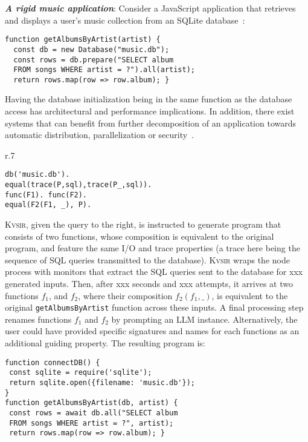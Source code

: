\documentclass[sigplan]{acmart}
\newcommand{\sys}{{\scshape Kv{\textalpha}sir}\xspace}
\newcommand{\heading}[1]{\vspace{2pt}\noindent\textbf{\emph{#1}}:\enspace}
\newcommand{\ttt}[1]{\texttt{#1}}
\newcommand{\xxx}{\colorbox{red!30}{xxx}\xspace}
\begin{document}
\heading{A rigid music application}
Consider a JavaScript application that retrieves and displays a user's music
collection from an SQLite database~\cite{codewithsadeemusicplayer, beets}:

\begin{verbatim}
function getAlbumsByArtist(artist) {
  const db = new Database("music.db");
  const rows = db.prepare("SELECT album
  FROM songs WHERE artist = ?").all(artist);
  return rows.map(row => row.album); }
\end{verbatim}

Having the database initialization being in the same function as 
the database access has architectural and performance implications.
In addition, there exist systems that can benefit from further decomposition
of an application towards automatic distribution, parallelization or security~\cite{Towards_Modern_Ghemaw_2023, vasilakis2019ignis, vasilakis2018breakapp}.
\begin{wrapfigure}[5]{r}{.7\columnwidth}
  \vspace{-10pt}
  \begin{verbatim}
db('music.db').
equal(trace(P,sql),trace(P_,sql)).
func(F1). func(F2).
equal(F2(F1, _), P).
\end{verbatim}
\end{wrapfigure}
\sys, given the query to the right, is instructed 
to generate program that consists of two functions,
whose composition is equivalent to the original program, and feature 
the same I/O and trace properties (a trace here being the sequence of SQL 
queries transmitted to the database).
\sys wraps the node process with monitors that extract the SQL queries 
sent to the database for \xxx generated inputs.
Then, after \xxx seconds and \xxx attempts, it arrives at two functions $f_1$, and 
$f_2$, where their composition $f_2(f_1, \_)$, is equivalent to the original \ttt{getAlbumsByArtist} function across these inputs.
A final processing step renames functions $f_1$ and $f_2$ by prompting an LLM instance.
Alternatively, the user could have provided specific signatures and names for each 
functions as an additional guiding property.
The resulting program is:
\begin{verbatim}
function connectDB() {
 const sqlite = require('sqlite');
 return sqlite.open({filename: 'music.db'}); 
}
function getAlbumsByArtist(db, artist) {
 const rows = await db.all("SELECT album
 FROM songs WHERE artist = ?", artist);
 return rows.map(row => row.album); }
\end{verbatim}
\end{document}
